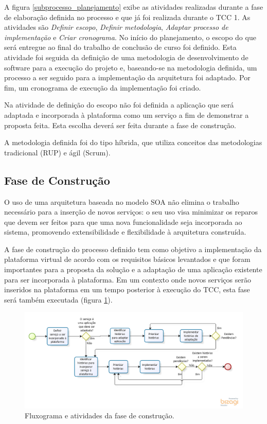 A figura \ref{subprocesso_planejamento} exibe as atividades realizadas durante a fase de elaboração definida no processo e que já foi realizada durante o TCC 1. As atividades são \textit{Definir escopo}, \textit{Definir metodologia}, \textit{Adaptar processo de implementação} e \textit{Criar cronograma}. No início do planejamento, o escopo do que será entregue ao final do trabalho de conclusão de curso foi definido. Esta atividade foi seguida da definição de uma metodologia de desenvolvimento de software para a execução do projeto e, baseando-se na metodologia definida, um processo a ser seguido para a implementação da arquitetura foi adaptado. Por fim, um cronograma de execução da implementação foi criado.

Na atividade de definição do escopo não foi definida a aplicação que será adaptada e incorporada à plataforma como um serviço a fim de demonstrar a proposta feita. Esta escolha deverá ser feita durante a fase de construção.

A metodologia definida foi do tipo híbrida, que utiliza conceitos das metodologias tradicional (RUP) e ágil (Scrum).

\subsection{Fase de Construção}
O uso de uma arquitetura baseada no modelo SOA não elimina o trabalho necessário para a inserção de novos serviços: o seu uso visa minimizar os reparos que devem ser feitos para que uma nova funcionalidade seja incorporada ao sistema, promovendo extensibilidade e flexibilidade à arquitetura construída.

A fase de construção do processo definido tem como objetivo a implementação da plataforma virtual de acordo com os requisitos básicos levantados e que foram importantes para a proposta da solução e a adaptação de uma aplicação existente para ser incorporada à plataforma. Em um contexto onde novos serviços serão inseridos na plataforma em um tempo posterior à execução do TCC, esta fase será também executada (figura \ref{subprocesso_implementacao}).

\begin{figure}[htb]
\centering
\includegraphics[width=1\textwidth]{figuras/subprocesso_implementacao.PNG}
\caption{Fluxograma e atividades da fase de construção.}
\label{subprocesso_implementacao}
\end{figure}


